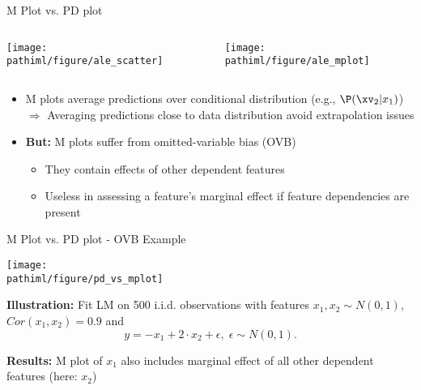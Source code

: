 \documentclass[11pt,compress,t,notes=noshow, aspectratio=169, xcolor=table]{beamer}
\newcommand{\pathiml}{../../slides/03_feature-effects/}
\begin{document}
\begin{frame}{M Plot vs. PD plot}

\begin{columns}[T]
\begin{column}{0.5\textwidth}
\centering
\texttt{[image: \\pathiml/figure/ale\_scatter]}
\end{column}
\begin{column}{0.5\textwidth}
\centering
\texttt{[image: \\pathiml/figure/ale\_mplot]}
\end{column}
\end{columns}


\begin{itemize}
    \item M plots average predictions over conditional distribution (e.g., $\P(\xv_2|x_1)$)\\
    $\Rightarrow$ Averaging predictions close to data distribution avoid extrapolation issues
    \item \textbf{But:} M plots suffer from omitted-variable bias (OVB)
\begin{itemize}
\item They contain effects of other dependent features
\item Useless in assessing a feature's marginal effect if feature dependencies are present
\end{itemize}
\end{itemize}


\end{frame}

\begin{frame}{M Plot vs. PD plot - OVB Example}

\begin{center}
\texttt{[image: \\pathiml/figure/pd\_vs\_mplot]}
\end{center}

\textbf{Illustration:} Fit LM on 500 i.i.d. observations with features $x_1, x_2 \sim N(0,1)$, $Cor(x_1, x_2) = 0.9$ and $$y = -x_1 + 2 \cdot x_2 + \epsilon, \; \epsilon \sim N(0,1).$$

\textbf{Results:} M plot of $x_1$ also includes marginal effect of all other dependent features (here: $x_2$)
\end{frame}
\end{document}
